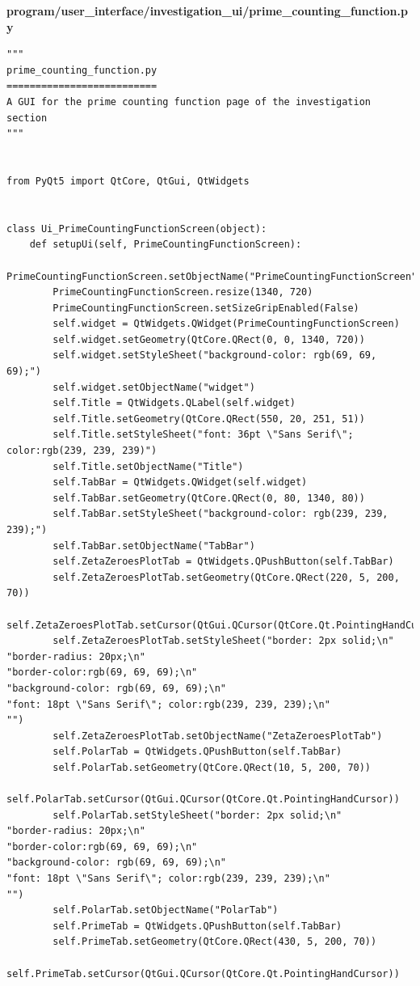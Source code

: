 \documentclass{article}
\begin{document}
\textbf{program/user\_interface/investigation\_ui/prime\_counting\_function.py}
\begin{lstlisting}
"""
prime_counting_function.py
==========================
A GUI for the prime counting function page of the investigation section
"""


from PyQt5 import QtCore, QtGui, QtWidgets


class Ui_PrimeCountingFunctionScreen(object):
    def setupUi(self, PrimeCountingFunctionScreen):
        PrimeCountingFunctionScreen.setObjectName("PrimeCountingFunctionScreen")
        PrimeCountingFunctionScreen.resize(1340, 720)
        PrimeCountingFunctionScreen.setSizeGripEnabled(False)
        self.widget = QtWidgets.QWidget(PrimeCountingFunctionScreen)
        self.widget.setGeometry(QtCore.QRect(0, 0, 1340, 720))
        self.widget.setStyleSheet("background-color: rgb(69, 69, 69);")
        self.widget.setObjectName("widget")
        self.Title = QtWidgets.QLabel(self.widget)
        self.Title.setGeometry(QtCore.QRect(550, 20, 251, 51))
        self.Title.setStyleSheet("font: 36pt \"Sans Serif\"; color:rgb(239, 239, 239)")
        self.Title.setObjectName("Title")
        self.TabBar = QtWidgets.QWidget(self.widget)
        self.TabBar.setGeometry(QtCore.QRect(0, 80, 1340, 80))
        self.TabBar.setStyleSheet("background-color: rgb(239, 239, 239);")
        self.TabBar.setObjectName("TabBar")
        self.ZetaZeroesPlotTab = QtWidgets.QPushButton(self.TabBar)
        self.ZetaZeroesPlotTab.setGeometry(QtCore.QRect(220, 5, 200, 70))
        self.ZetaZeroesPlotTab.setCursor(QtGui.QCursor(QtCore.Qt.PointingHandCursor))
        self.ZetaZeroesPlotTab.setStyleSheet("border: 2px solid;\n"
"border-radius: 20px;\n"
"border-color:rgb(69, 69, 69);\n"
"background-color: rgb(69, 69, 69);\n"
"font: 18pt \"Sans Serif\"; color:rgb(239, 239, 239);\n"
"")
        self.ZetaZeroesPlotTab.setObjectName("ZetaZeroesPlotTab")
        self.PolarTab = QtWidgets.QPushButton(self.TabBar)
        self.PolarTab.setGeometry(QtCore.QRect(10, 5, 200, 70))
        self.PolarTab.setCursor(QtGui.QCursor(QtCore.Qt.PointingHandCursor))
        self.PolarTab.setStyleSheet("border: 2px solid;\n"
"border-radius: 20px;\n"
"border-color:rgb(69, 69, 69);\n"
"background-color: rgb(69, 69, 69);\n"
"font: 18pt \"Sans Serif\"; color:rgb(239, 239, 239);\n"
"")
        self.PolarTab.setObjectName("PolarTab")
        self.PrimeTab = QtWidgets.QPushButton(self.TabBar)
        self.PrimeTab.setGeometry(QtCore.QRect(430, 5, 200, 70))
        self.PrimeTab.setCursor(QtGui.QCursor(QtCore.Qt.PointingHandCursor))

\end{lstlisting}
\end{document}
